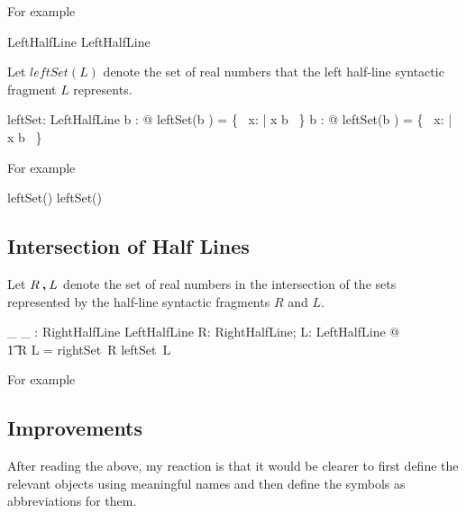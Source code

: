 \documentclass{amsart}
\begin{document}
For example

\begin{zed}
	\zeroR \openUpperBound \in LeftHalfLine
\also
	\oneR \closedUpperBound \in LeftHalfLine
\end{zed}

Let $leftSet(L)$ denote the set of real numbers that the left half-line syntactic fragment $L$ represents.

\begin{axdef}
	leftSet: LeftHalfLine \fun \power \R
\where
	\forall b : \R @ leftSet(b \openUpperBound) = \{~ x: \R | x \ltR b ~\}
\also
	\forall b : \R @ leftSet(b \closedUpperBound) = \{~ x: \R | x \leR b ~\}
\end{axdef}

For example

\begin{zed}
	\zeroR \notin leftSet(\zeroR \openUpperBound)
\also
	\oneR \in leftSet(\oneR \closedUpperBound)
\end{zed}

\subsection{Intersection of Half Lines}

Let $R \mathbin{\boldsymbol{,}} L$ denote the set of real numbers in the intersection of the sets represented by
the half-line syntactic fragments $R$ and $L$.

\begin{axdef}
	\_ \intersectRightLeft \_ : RightHalfLine \cross LeftHalfLine \fun \power \R
\where
	\forall R: RightHalfLine; L: LeftHalfLine @ \\
	\t1	R \intersectRightLeft L = rightSet~R \cap leftSet~L
\end{axdef}

For example

\begin{zed}
	\zeroR \in \closedLowerBound \zeroR \intersectRightLeft \oneR \openUpperBound
\end{zed}

\subsection{Improvements}

After reading the above, my reaction is that it would be clearer to first define the relevant objects using meaningful names
and then define the symbols as abbreviations for them.
\end{document}
